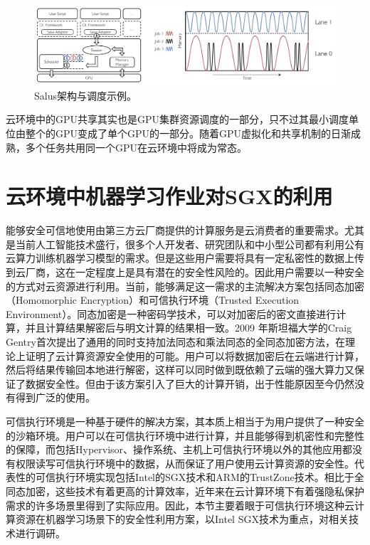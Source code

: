 \begin{figure}[h]
    \centerline{\includegraphics[width=\textwidth]{figures/salus-arch-sche.png}}
    \caption{Salus架构与调度示例。}
    \label{salus_arch_sche}
\end{figure}

云环境中的GPU共享其实也是GPU集群资源调度的一部分，只不过其最小调度单位由整个的GPU变成了单个GPU的一部分。随着GPU虚拟化和共享机制的日渐成熟，多个任务共用同一个GPU在云环境中将成为常态。

\section{云环境中机器学习作业对SGX的利用}
能够安全可信地使用由第三方云厂商提供的计算服务是云消费者的重要需求。尤其是当前人工智能技术盛行，很多个人开发者、研究团队和中小型公司都有利用公有云算力训练机器学习模型的需求。但是这些用户需要将具有一定私密性的数据上传到云厂商，这在一定程度上是具有潜在的安全性风险的。因此用户需要以一种安全的方式对云资源进行利用。当前，能够满足这一需求的主流解决方案包括同态加密（Homomorphic Encryption）和可信执行环境（Trusted Execution Environment）。同态加密是一种密码学技术，可以对加密后的密文直接进行计算，并且计算结果解密后与明文计算的结果相一致。2009 年斯坦福大学的Craig Gentry首次提出了通用的同时支持加法同态和乘法同态的全同态加密方法，在理论上证明了云计算资源安全使用的可能。用户可以将数据加密后在云端进行计算，然后将结果传输回本地进行解密，这样可以同时做到既依赖了云端的强大算力又保证了数据安全性。但由于该方案引入了巨大的计算开销，出于性能原因至今仍然没有得到广泛的使用。

可信执行环境是一种基于硬件的解决方案，其本质上相当于为用户提供了一种安全的沙箱环境。用户可以在可信执行环境中进行计算，并且能够得到机密性和完整性的保障，而包括Hypervisor、操作系统、主机上可信执行环境以外的其他应用都没有权限读写可信执行环境中的数据，从而保证了用户使用云计算资源的安全性。代表性的可信执行环境实现包括Intel的SGX技术和ARM的TrustZone技术。相比于全同态加密，这些技术有着更高的计算效率，近年来在云计算环境下有着强隐私保护需求的许多场景里得到了实际应用。因此，本节主要着眼于可信执行环境这种云计算资源在机器学习场景下的安全性利用方案，以Intel SGX技术为重点，对相关技术进行调研。

